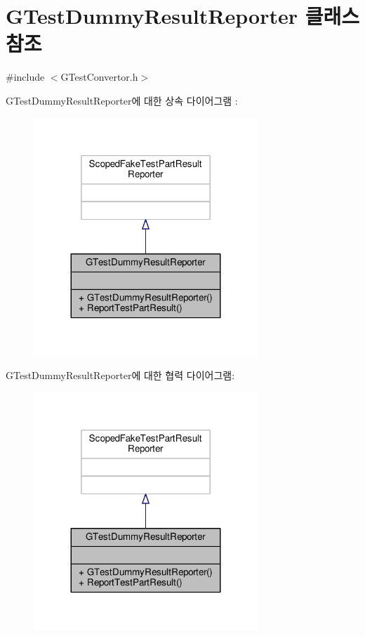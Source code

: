 \hypertarget{class_g_test_dummy_result_reporter}{}\section{G\+Test\+Dummy\+Result\+Reporter 클래스 참조}
\label{class_g_test_dummy_result_reporter}


{\ttfamily \#include $<$G\+Test\+Convertor.\+h$>$}



G\+Test\+Dummy\+Result\+Reporter에 대한 상속 다이어그램 \+: 
\nopagebreak
\begin{figure}[H]
\begin{center}
\leavevmode
\includegraphics[width=239pt]{class_g_test_dummy_result_reporter__inherit__graph}
\end{center}
\end{figure}


G\+Test\+Dummy\+Result\+Reporter에 대한 협력 다이어그램\+:
\nopagebreak
\begin{figure}[H]
\begin{center}
\leavevmode
\includegraphics[width=239pt]{class_g_test_dummy_result_reporter__coll__graph}
\end{center}
\end{figure}
